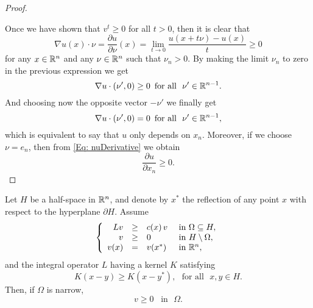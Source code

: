 \begin{proof}
\begin{enumerate}
\end{enumerate}

Once we have shown that $v^t\geq 0$ for all $t>0$, then it is clear that
\begin{equation}
\label{Eq: nuDerivative}
\nabla u(x) \cdot \nu = \frac{\partial u}{\partial \nu} (x) = \lim_{t \to 0}  \frac{u(x+t\nu)-u(x)}{t} \geq 0
\end{equation}
for any $x\in \mathbb{R}^n$ and any $\nu\in \mathbb{R}^n$ such that $\nu_n>0$.
By making the limit $\nu_n$ to zero in the previous expression we get
$$ \nabla u \cdot (\nu',0) \geq 0 \,\,\, \text{for all } \,\, \nu'\in\mathbb{R}^{n-1}. $$
And choosing now the opposite vector $-\nu'$ we finally get
$$ \nabla u \cdot (\nu',0) = 0 \,\,\, \text{for all } \,\, \nu'\in\mathbb{R}^{n-1}, $$
which is equivalent to say that $u$ only depends on $x_n$. Moreover, if we choose $\nu = e_n$, then from \eqref{Eq: nuDerivative} we obtain
$$ \frac{\partial u}{\partial x_n} \geq 0. $$
\end{proof}


\begin{proposition}
\label{Prop:MaxPrpNarrowOdd}
Let $H$ be a half-space in $\mathbb{R}^n$, and denote by $x^*$ the reflection of any point $x$ with respect to the hyperplane $\partial H$. Assume
\begin{equation}
\left\{\begin{array}{rcll}
L v &\geq& c(x)\,v  &\textrm{ in } \Omega\subseteq H,\\
v &\geq& 0 &\textrm{ in } H\setminus\Omega,\\
v(x) &=& v(x^*) &\textrm{ in } \mathbb{R}^n,
\end{array} \right.
\end{equation}
and the integral operator $L$ having a kernel $K$ satisfying
\begin{equation}
\label{Eq: KernelSymmetry}
K(x-y) \geq K(x-y^*), \,\,\,\,\text{for all } \,\, x,y\in H.
\end{equation}
Then, if $\Omega$ is narrow,
$$ v \geq 0 \,\,\, \text{ in } \,\, \Omega. $$
\end{proposition}

